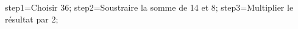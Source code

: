 \documentclass[exercice]{thedocument}%
\begin{document}
%
    \>step1=Choisir 36;%
    \>step2=Soustraire la somme de 14 et 8;%
    \>step3=Multiplier le résultat par 2;%
\end{document}
